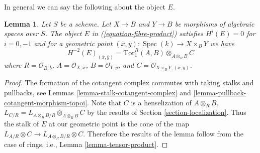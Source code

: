 \documentclass{stacks-project}
\theoremstyle{plain}
\newtheorem{lemma}[subsection]{Lemma}
\theoremstyle{definition}
\theoremstyle{remark}
\numberwithin{equation}{subsection}
\def\Spec{\mathop{\mathrm{Spec}}}
\begin{document}
\noindent
In general we can say the following about the object $E$.

\begin{lemma}
\label{lemma-fibre-product}
Let $S$ be a scheme. Let $X \to B$ and $Y \to B$ be morphisms of algebraic
spaces over $S$. The object $E$ in (\ref{equation-fibre-product}) satisfies
$H^i(E) = 0$ for $i = 0, -1$ and for a geometric point
$(\overline{x}, \overline{y}) : \Spec(k) \to X \times_B Y$ we have
$$
H^{-2}(E)_{(\overline{x}, \overline{y})} =
\text{Tor}_1^R(A, B) \otimes_{A \otimes_R B} C
$$
where $R = \mathcal{O}_{B, \overline{b}}$, $A = \mathcal{O}_{X, \overline{x}}$,
$B = \mathcal{O}_{Y, \overline{y}}$, and
$C = \mathcal{O}_{X \times_B Y, (\overline{x}, \overline{y})}$.
\end{lemma}

\begin{proof}
The formation of the cotangent complex commutes with taking stalks
and pullbacks, see
Lemmas \ref{lemma-stalk-cotangent-complex} and
\ref{lemma-pullback-cotangent-morphism-topoi}.
Note that $C$ is a henselization of $A \otimes_R B$.
$L_{C/R} = L_{A \otimes_R B/R} \otimes_{A \otimes_R B} C$
by the results of Section \ref{section-localization}.
Thus the stalk of $E$ at our geometric point is the cone of the
map $L_{A/R} \otimes C \to L_{A \otimes_R B/R} \otimes C$.
Therefore the results of the lemma follow from
the case of rings, i.e., Lemma \ref{lemma-tensor-product}.
\end{proof}












\end{document}

